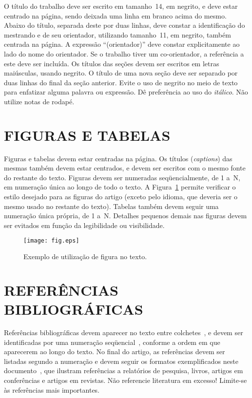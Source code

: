 \documentclass{sa}
\begin{document}
O título do trabalho deve ser escrito em tamanho~14, em negrito, e deve 
estar centrado na página, sendo deixada uma linha em branco acima do mesmo. 
Abaixo do título, separada deste por duas linhas, deve constar a identificação 
do mestrando e de seu orientador, utilizando tamanho~11, em negrito, também 
centrada na página. A expressão ``(orientador)'' deve constar explicitamente 
ao lado do nome do orientador. Se o trabalho tiver um co-orientador, a 
referência a este deve ser incluída. Os títulos das seções devem ser escritos 
em letras maiúsculas, usando negrito. O título de uma nova seção deve ser 
separado por duas linhas do final da seção anterior. Evite o uso de negrito 
no meio de texto para enfatizar alguma palavra ou expressão. 
Dê preferência ao uso do \emph{itálico}. Não utilize notas de rodapé.
\section{FIGURAS E TABELAS}
Figuras e tabelas devem estar centradas na página. Os títulos (\emph{captions}) 
das mesmas também devem estar centrados, e devem ser escritos com o mesmo 
fonte do restante do texto. Figuras devem ser numeradas seqüencialmente, de 
1 a~N, em numeração única ao longo de todo o texto. A Figura~\ref{fig} permite 
verificar o estilo desejado para as figuras do artigo (exceto pelo idioma, 
que deveria ser o mesmo usado no restante do texto). Tabelas também devem 
seguir uma numeração única própria, de 1 a~N\@. Detalhes pequenos demais nas 
figuras devem ser evitados em função da legibilidade ou visibilidade.

\begin{figure}
	\centerline{\texttt{[image: fig.eps]}}
	\caption{Exemplo de utilização de figura no texto.}
	\label{fig}
\end{figure}

\section{REFERÊNCIAS BIBLIOGRÁFICAS}
Referências bibliográficas devem aparecer no texto entre colchetes~\cite{chu}, e 
devem ser identificadas por uma numeração seqüencial~\cite{wagner}, conforme a 
ordem em que aparecerem ao longo do texto. No final do artigo, as referências 
devem ser listadas segundo a numeração e devem seguir os formatos 
exemplificados neste documento~\cite{chu}, que ilustram referências a 
relatórios de pesquisa, livros, artigos em conferências e artigos em revistas. 
Não referencie literatura em excesso! Limite-se às referências mais importantes.
\end{document}
